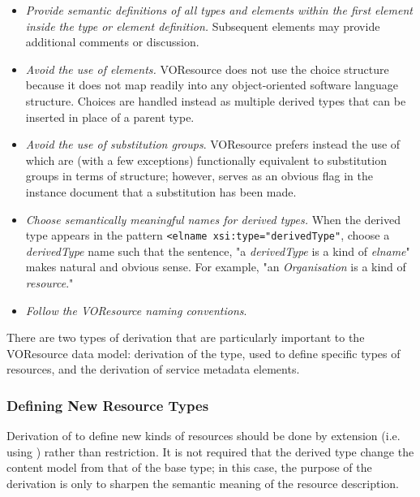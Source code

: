 \documentclass[11pt,a4paper]{ivoa}
\begin{document}
\begin{itemize}
  \item \emph{Provide semantic definitions of all types and elements within
       the first  element inside
       the type or element definition.}  Subsequent
        elements may provide
       additional comments or discussion.  

  \item \emph{Avoid the use of  elements.}
       VOResource does not use the choice structure because it does
       not map readily into any object-oriented software language
       structure.  Choices are handled instead as multiple derived
       types that can be inserted in place of a parent type.  

  \item \emph{Avoid the use of substitution groups}.  VOResource
       prefers instead the use of  which are
       (with a few exceptions) functionally equivalent to substitution
       groups in terms of structure; however, 
       serves as an obvious flag in the instance document that a
       substitution has been made. 

  \item \emph{Choose semantically meaningful names for derived
       types.}  When the derived type appears in the pattern
       \verb|<elname xsi:type="derivedType"|,
       choose a \textit{derivedType} name such that the sentence, "a
       \textit{derivedType} is a kind of \textit{elname}" makes natural
       and obvious sense.  For example, "an \textit{Organisation} is a
       kind of \textit{resource}." 

  \item \emph{Follow the VOResource naming conventions}. 
\end{itemize}



There are two types of derivation that are particularly important to
the VOResource data model:  derivation of the 
type, used to define specific types of resources, and the derivation
of service metadata elements.  


\subsubsection{Defining New Resource Types}
\label{sect:definingresourcetypes}


Derivation of  to define new kinds of
resources should be done by extension (i.e. using 
) rather than restriction.  It is
not required that the derived type change the content model from that
of the  base type; in this case, the purpose
of the derivation is only to sharpen the semantic meaning of the
resource description.  
\end{document}
